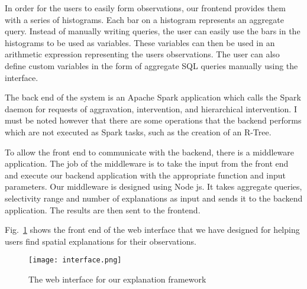 In order for the users to easily form observations, our frontend provides them with a series of histograms. Each bar on a histogram represents an aggregate query. Instead of manually writing queries, the user can easily use the bars in the histograms to be used as variables. These variables can then be used in an arithmetic expression representing the users observations. The user can also define custom variables in the form of aggregate SQL queries manually using the interface.

The back end of the system is an Apache Spark application which calls the Spark daemon for requests of aggravation, intervention, and hierarchical intervention. I must be noted however that there are some operations that the backend performs which are not executed as Spark tasks, such as the creation of an R-Tree.

To allow the front end to communicate with the backend, there is a middleware application. The job of the middleware is to take the input from the front end and execute our backend application with the appropriate function and input parameters. Our middleware is designed using Node js. It takes aggregate queries, selectivity range and number of explanations as input and sends it to the backend application. The results are then sent to the frontend. 

Fig.~\ref{fig:interface} shows the front end of the web interface that we have designed for helping users find spatial explanations for their observations.

\begin{figure}[h]
\texttt{[image: interface.png]}
\caption{The web interface for our explanation framework}
\label{fig:interface}
\end{figure}
